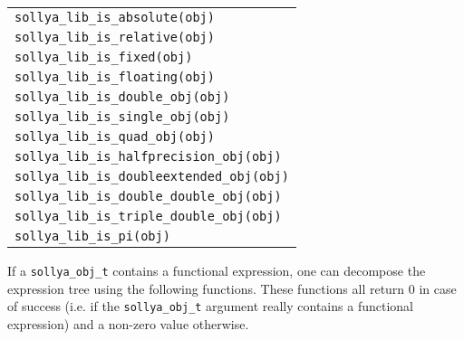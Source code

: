 \documentclass[a4paper]{article}
\begin{document}
\begin{table}[htp]
\begin{center}
\begin{tabular}{|l|}
      \verb|sollya_lib_is_absolute(obj)| \\
      \verb|sollya_lib_is_relative(obj)| \\
      \verb|sollya_lib_is_fixed(obj)| \\
      \verb|sollya_lib_is_floating(obj)| \\
      \verb|sollya_lib_is_double_obj(obj)| \\
      \verb|sollya_lib_is_single_obj(obj)| \\
      \verb|sollya_lib_is_quad_obj(obj)| \\
      \verb|sollya_lib_is_halfprecision_obj(obj)| \\
      \verb|sollya_lib_is_doubleextended_obj(obj)| \\
      \verb|sollya_lib_is_double_double_obj(obj)| \\
      \verb|sollya_lib_is_triple_double_obj(obj)| \\
      \verb|sollya_lib_is_pi(obj)| \\
      \hline
  \end{tabular}
\end{center}
\end{table}

If a \texttt{sollya\_obj\_t} contains a functional expression, one can decompose the expression tree using the following functions. These functions all return 0 in case of success (i.e. if the \texttt{sollya\_obj\_t} argument really contains a functional expression) and a non-zero value otherwise.
\end{document}
